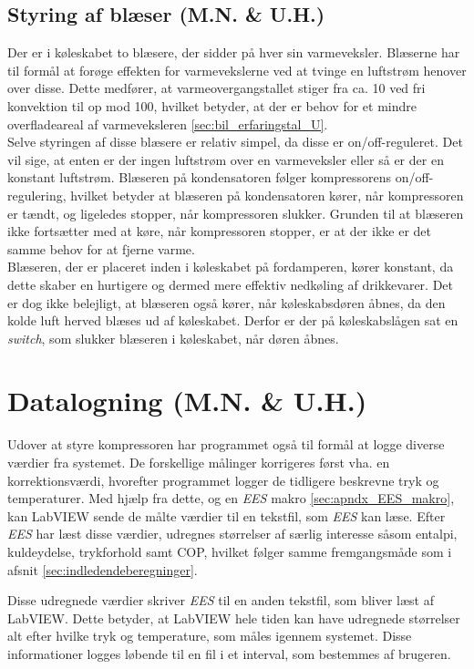 \documentclass[../Hovedrapport.tex]{subfiles}
\begin{document}
\subsection*{Styring af blæser (M.N. \& U.H.)}
Der er i køleskabet to blæsere, der sidder på hver sin varmeveksler. Blæserne har til formål at forøge effekten for varmevekslerne ved at tvinge en luftstrøm henover over disse. Dette medfører, at varmeovergangstallet stiger fra ca. \SI{10}{} ved fri konvektion til op mod \SI{100}{}, hvilket betyder, at der er behov for et mindre overfladeareal af varmeveksleren \ref{sec:bil_erfaringstal_U}. \\
Selve styringen af disse blæsere er relativ simpel, da disse er on/off-reguleret. Det vil sige, at enten er der ingen luftstrøm over en varmeveksler eller så er der en konstant luftstrøm. Blæseren på kondensatoren følger kompressorens on/off-regulering, hvilket betyder at blæseren på kondensatoren kører, når kompressoren er tændt, og ligeledes stopper, når kompressoren slukker. Grunden til at blæseren ikke fortsætter med at køre, når kompressoren stopper, er at der ikke er det samme behov for at fjerne varme. \\
Blæseren, der er placeret inden i køleskabet på fordamperen, kører konstant, da dette skaber en hurtigere og dermed mere effektiv nedkøling af drikkevarer. Det er dog ikke belejligt, at blæseren også kører, når køleskabsdøren åbnes, da den kolde luft herved blæses ud af køleskabet. Derfor er der på køleskabslågen sat en \textit{switch}, som slukker blæseren i køleskabet, når døren åbnes. 
\section{Datalogning (M.N. \& U.H.)}
Udover at styre kompressoren har programmet også til formål at logge diverse værdier fra systemet. 
De forskellige målinger korrigeres først vha. en korrektionsværdi, hvorefter programmet logger de tidligere beskrevne tryk og temperaturer. Med hjælp fra dette, og en \textit{EES} makro \ref{sec:apndx_EES_makro}, kan LabVIEW sende de målte værdier til en tekstfil, som \textit{EES} kan læse. Efter \textit{EES} har læst disse værdier, udregnes størrelser af særlig interesse såsom entalpi, kuldeydelse, trykforhold samt COP, hvilket følger samme fremgangsmåde som i afsnit \ref{sec:indledendeberegninger}. 

Disse udregnede værdier skriver \textit{EES} til en anden tekstfil, som bliver læst af LabVIEW. Dette betyder, at LabVIEW hele tiden kan have udregnede størrelser alt efter hvilke tryk og temperature, som måles igennem systemet. 
Disse informationer logges løbende til en fil i et interval, som bestemmes af brugeren. 
\end{document}
